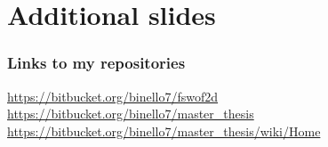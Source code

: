 \documentclass[xcolor=dvipsnames, USenglish]{beamer}  %
\begin{document}
\section{Additional slides}
  \begin{frame}
    \frametitle{Links to my repositories}
    \small{\url{https://bitbucket.org/binello7/fswof2d}}\\
    \small{\url{https://bitbucket.org/binello7/master_thesis}}\\
    \small{\url{https://bitbucket.org/binello7/master_thesis/wiki/Home}}
  \end{frame}

\end{document}
